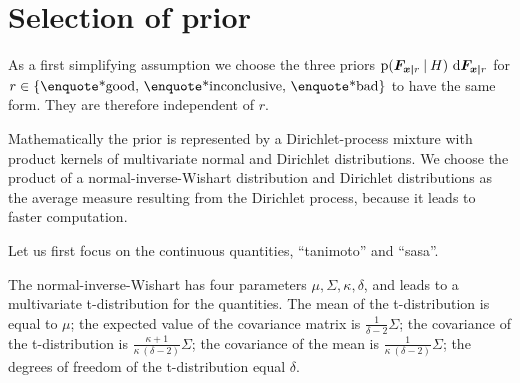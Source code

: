 \documentclass[\ifafour a4paper,12pt,\else a5paper,10pt,\fi%
onecolumn,oneside,article,%
british%
]{memoir}
\theoremstyle{remark}
\theoremstyle{innote}
\newcommand*{\di}{\mathrm{d}}%
\DeclarePairedDelimiter\set{\{}{\}}
\newcommand*{\p}{\mathrm{p}}%
\renewcommand*{\|}[1][]{\nonscript\:#1\vert\nonscript\:\mathopen{}}
\renewcommand*{\=}{\TextOrMath\texteq\eq}
\newcommand*{\yF}{\bm{F}}
\begin{document}


\section{Selection of prior}
\label{sec:sel_prior_reverse}

As a first simplifying assumption we choose the three priors
$\p(\yF_{\bm{x\mid}r} \| H)\ \di\yF_{\bm{x\mid}r}$ for
$r \in \set{\text{\enquote*{good}},\, \text{\enquote*{inconclusive}},\,
  \text{\enquote*{bad}}}$ to have the same form. They are therefore
independent of $r$.

Mathematically the prior is represented by a Dirichlet-process mixture with
product kernels of multivariate normal and Dirichlet distributions. We
choose the product of a normal-inverse-Wishart distribution and Dirichlet
distributions as the average measure resulting from the Dirichlet process,
because it leads to faster computation.

Let us first focus on the continuous quantities, \enquote{tanimoto} and
\enquote{sasa}.

The normal-inverse-Wishart has four parameters
$\mu, \varSigma, \kappa, \delta$, and leads to a multivariate
t-distribution for the quantities. The mean of the t-distribution is equal
to $\mu$; the expected value of the covariance matrix is
$\frac{1}{\delta-2}\varSigma$; the covariance of the t-distribution is
$\frac{\kappa+1}{\kappa\ (\delta-2)}\varSigma$; the covariance of the mean
is $\frac{1}{\kappa\ (\delta-2)}\varSigma$; the degrees of freedom of the
t-distribution equal $\delta$.
\end{document}
